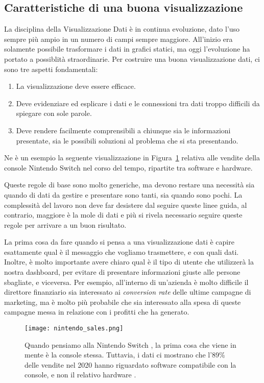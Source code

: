 \subsection{Caratteristiche di una buona visualizzazione}
La disciplina della Visualizzazione Dati è in continua evoluzione, dato l'uso sempre più ampio in un numero di campi sempre maggiore. All'inizio era solamente possibile trasformare i dati in grafici statici, ma oggi l'evoluzione ha portato a possiblità straordinarie.
Per costruire una buona visualizzazione dati, ci sono tre aspetti fondamentali:
\begin{enumerate}
    \item La visualizzazione deve essere efficace.
    \item Deve evidenziare ed esplicare i dati e le connessioni tra dati troppo difficili da spiegare con sole parole.
    \item Deve rendere facilmente comprensibili a chiunque sia le informazioni presentate, sia le possibili soluzioni al problema che si sta presentando.
\end{enumerate}
Ne è un esempio la seguente visualizzazione in Figura~\ref{fig:nintendo_sales} relativa alle vendite della console Nintendo Switch \texttrademark nel corso del tempo, ripartite tra software e hardware.

Queste regole di base sono molto generiche, ma devono restare una necessità sia quando di dati da gestire e presentare sono tanti, sia quando sono pochi. La complessità del lavoro non deve far desistere dal seguire queste linee guida, al contrario, maggiore è la mole di dati e più si rivela necessario seguire queste regole per arrivare a un buon risultato.

La prima cosa da fare quando si pensa a una visualizzazione dati è capire esattamente qual è il messaggio che vogliamo trasmettere, e con quali dati. Inoltre, è molto importante avere chiaro qual è il tipo di utente che utilizzerà la nostra dashboard, per evitare di presentare informazioni giuste alle persone sbagliate, e viceversa. Per esempio, all'interno di un'azienda è molto difficile il direttore finanziario sia interessato ai \textit{conversion rate} delle ultime campagne di marketing, ma è molto più probabile che sia interessato alla spesa di queste campagne messa in relazione con i profitti che ha generato.

\begin{figure}[H]
    \centering
    \texttt{[image: nintendo\_sales.png]}
    \caption[Dataviz: vendite di console Nintendo Switch]{Quando pensiamo alla Nintendo Switch \texttrademark, la prima cosa che viene in mente è la console stessa. Tuttavia, i dati ci mostrano che l'89\% delle vendite nel 2020 hanno riguardato software compatibile con la console, e non il relativo hardware \cite{DataVisualization_Caratteristiche}.}
    \label{fig:nintendo_sales}
\end{figure}

